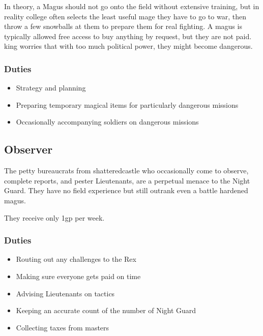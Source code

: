 \begin{multicols}{2}
In theory, a Magus should not go onto the field without extensive training, but in reality \gls{college} often selects the least useful mage they have to go to war, then throw a few snowballs at them to prepare them for real fighting.
A magus is typically allowed free access to buy anything by request, but they are not paid.
\Gls{king} worries that with too much political power, they might become dangerous.

\subsubsection{Duties}

\begin{itemize}

	\item{Strategy and planning}
	\item{Preparing temporary magical items for particularly dangerous missions}
	\item{Occasionally accompanying soldiers on dangerous missions}

\end{itemize}

\subsection{Observer}

The petty bureaucrats from \gls{shatteredcastle} who occasionally come to observe, complete reports, and pester Lieutenants, are a perpetual menace to the Night Guard.
They have no field experience but still outrank even a battle hardened magus.

They receive only 1gp per week.

\subsubsection{Duties}

\begin{itemize}

	\item{Routing out any challenges to the Rex}
	\item{Making sure everyone gets paid on time}
	\item{Advising Lieutenants on tactics}
	\item{Keeping an accurate count of the number of Night Guard}
	\item{Collecting taxes from masters}

\end{itemize}


\end{multicols}
